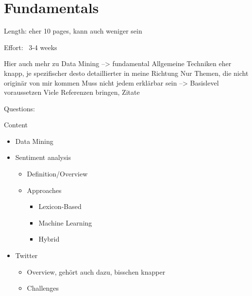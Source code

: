 \chapter{Fundamentals}
\label{cha:Chapter3_Fundamentals}

Length: eher 10 pages, kann auch weniger sein

Effort: ~3-4 weeks

Hier auch mehr zu Data Mining --> fundamental
Allgemeine Techniken eher knapp, je spezifischer desto detaillierter in meine Richtung
Nur Themen, die nicht originär von mir kommen
Muss nicht jedem erklärbar sein --> Basislevel voraussetzen
Viele Referenzen bringen, Zitate

Questions:
\begin{itemize}

\end{itemize}

Content
\begin{itemize}
\item Data Mining
\item Sentiment analysis
\begin{itemize}
\item Definition/Overview
\item Approaches
\begin{itemize}
\item Lexicon-Based
\item Machine Learning
\item Hybrid
\end{itemize}
\end{itemize}
\item Twitter
\begin{itemize}
\item Overview, gehört auch dazu, bisschen knapper
\item Challenges
\end{itemize}

\end{itemize}

